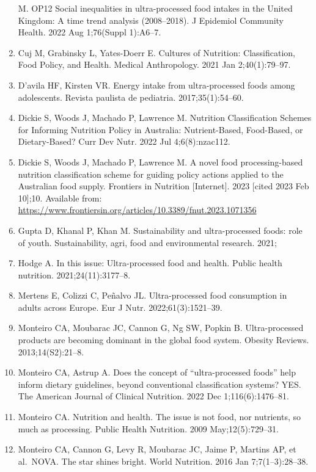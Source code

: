 \documentclass[
]{article}
\begin{document}
\begin{enumerate}
  M. OP12 Social inequalities in ultra-processed food intakes in the
  United Kingdom: A time trend analysis (2008--2018). J Epidemiol
  Community Health. 2022 Aug 1;76(Suppl 1):A6--7.
\item
  Cuj M, Grabinsky L, Yates-Doerr E. Cultures of Nutrition:
  Classification, Food Policy, and Health. Medical Anthropology. 2021
  Jan 2;40(1):79--97.
\item
  D'avila HF, Kirsten VR. Energy intake from ultra-processed foods among
  adolescents. Revista paulista de pediatria. 2017;35(1):54--60.
\item
  Dickie S, Woods J, Machado P, Lawrence M. Nutrition Classification
  Schemes for Informing Nutrition Policy in Australia: Nutrient-Based,
  Food-Based, or Dietary-Based? Curr Dev Nutr. 2022 Jul 4;6(8):nzac112.
\item
  Dickie S, Woods J, Machado P, Lawrence M. A novel food
  processing-based nutrition classification scheme for guiding policy
  actions applied to the Australian food supply. Frontiers in Nutrition
  {[}Internet{]}. 2023 {[}cited 2023 Feb 10{]};10. Available from:
  \url{https://www.frontiersin.org/articles/10.3389/fnut.2023.1071356}
\item
  Gupta D, Khanal P, Khan M. Sustainability and ultra-processed foods:
  role of youth. Sustainability, agri, food and environmental research.
  2021;
\item
  Hodge A. In this issue: Ultra-processed food and health. Public health
  nutrition. 2021;24(11):3177--8.
\item
  Mertens E, Colizzi C, Peñalvo JL. Ultra-processed food consumption in
  adults across Europe. Eur J Nutr. 2022;61(3):1521--39.
\item
  Monteiro CA, Moubarac JC, Cannon G, Ng SW, Popkin B. Ultra-processed
  products are becoming dominant in the global food system. Obesity
  Reviews. 2013;14(S2):21--8.
\item
  Monteiro CA, Astrup A. Does the concept of ``ultra-processed foods''
  help inform dietary guidelines, beyond conventional classification
  systems? YES. The American Journal of Clinical Nutrition. 2022 Dec
  1;116(6):1476--81.
\item
  Monteiro CA. Nutrition and health. The issue is not food, nor
  nutrients, so much as processing. Public Health Nutrition. 2009
  May;12(5):729--31.
\item
  Monteiro CA, Cannon G, Levy R, Moubarac JC, Jaime P, Martins AP, et
  al.~NOVA. The star shines bright. World Nutrition. 2016 Jan
  7;7(1--3):28--38.

\end{enumerate}
\end{document}
